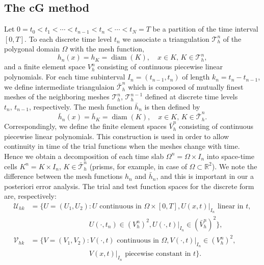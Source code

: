 \documentclass{amsart}
\numberwithin{equation}{section}
\theoremstyle{definition}
\begin{document}
\subsection{The cG method}
Let $0=t_0<t_1<\cdots<t_{n-1}<t_n<\cdots<t_N=T$ be a partition of the time interval $[0,T]$.
To each discrete time level $t_n$ we associate a triangulation ${\mathcal T}_h^n$ of the polygonal domain $\Omega$ with the mesh function,
\begin{equation}   \label{hn}
  h_n(x)=h_K=\operatorname{diam}(K),\quad x\in K,\,K\in{\mathcal T}_h^n,
\end{equation}
and a finite element space $V_h^n$ consisting of continuous
piecewise linear polynomials.
For each time subinterval $I_n=(t_{n-1},t_n)$ of length $k_n=t_n-t_{n-1}$,
we define intermediate triangulaion $\bar {\mathcal T}_h^n$ which is composed
of mutually finest meshes of the neighboring meshes
${\mathcal T}_h^n,\,{\mathcal T}_h^{n-1}$ defined at discrete time levels $t_n,\,t_{n-1}$, respectively.
The mesh function $\bar h_n$ is then defined by
\begin{equation}   \label{barhn}
  \bar h_n(x)=\bar h_K=\operatorname{diam}(K),\quad x\in K,\,K\in\bar{\mathcal T}_h^n.
\end{equation}
Correspondingly, we define the finite element spaces
$\bar V_h^n$ consisting of continuous piecewise linear polynomials.
This construction is used in order to allow continuity in time of the
trial functions when the meshes change with time.
Hence we obtain a decomposition of each time slab
$\Omega^n=\Omega\times I_n$ into space-time cells
$K^n=K\times I_n,\,K\in \bar{\mathcal T}_h^n$
(prisms, for example, in case of $\Omega\subset \mathbb{R}^2$).
We note the difference between the mesh functions $h_n$ and
$\bar h_n$, and this is important in our a posteriori error
analysis.
The trial and test function spaces for the discrete form are,
respectively:
\begin{equation}   \label{discretespaces}
  \begin{split}
    {\mathcal U}_{hk}&=\Big\{U=(U_1,U_2):
      U \text{ continuous in } \Omega\times [0,T],
     
        U(x,t)|_{I_n} \text{ linear in } t,\\
      &\qquad\qquad\qquad\qquad\
        U(\cdot,t_n)\in (V_h^n)^2, U(\cdot,t)|_{I_n}
          \in (\bar V_h^n)^2 \Big\},\\
    {\mathcal V}_{hk}&=\Big\{V=(V_1,V_2):
      V(\cdot,t) \text{ continuous in } \Omega,
       
         V(\cdot,t)|_{I_n}\in (V_h^n)^2,\\
       &\qquad\qquad\qquad\qquad\
         V(x,t)|_{I_n} \text{ piecewise constant in } t\Big\}.
  \end{split}
\end{equation}
\end{document}
